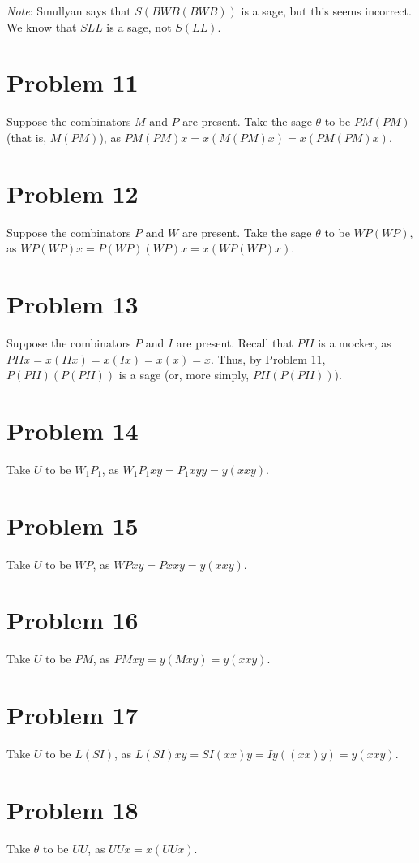 \documentclass{article}
\theoremstyle{definition}
\begin{document}
\textit{Note}: Smullyan says that $S(BWB(BWB))$ is a sage, but this seems incorrect. We know that $SLL$ is a sage, not $S(LL)$.

\section*{Problem 11}
Suppose the combinators $M$ and $P$ are present. Take the sage $\theta$ to be $PM(PM)$ (that is, $M(PM)$), as $PM(PM)x=x(M(PM)x)=x(PM(PM)x)$.

\section*{Problem 12}
Suppose the combinators $P$ and $W$ are present. Take the sage $\theta$ to be $WP(WP)$, as $WP(WP)x=P(WP)(WP)x=x(WP(WP)x)$. 

\section*{Problem 13}
Suppose the combinators $P$ and $I$ are present. Recall that $PII$ is a mocker, as $PIIx=x(IIx)=x(Ix)=x(x)=x$. Thus, by Problem 
11, $P(PII)(P(PII))$ is a sage (or, more simply, $PII(P(PII))$).

\section*{Problem 14}
Take $U$ to be $W_1P_1$, as $W_1P_1xy=P_1xyy=y(xxy)$.

\section*{Problem 15}
Take $U$ to be $WP$, as $WPxy=Pxxy=y(xxy)$.

\section*{Problem 16}
Take $U$ to be $PM$, as $PMxy=y(Mxy)=y(xxy)$.

\section*{Problem 17}
Take $U$ to be $L(SI)$, as $L(SI)xy=SI(xx)y=Iy((xx)y)=y(xxy)$.

\section*{Problem 18}
Take $\theta$ to be $UU$, as $UUx=x(UUx)$.
\end{document}
